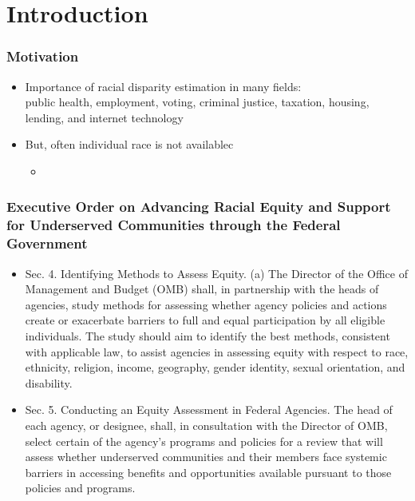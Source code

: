 \documentclass[handout]{beamer}
\title[Algorithm-Assisted Human Decision]{\tit}
\institute[Harvard]{\large Harvard University }
\date{Department of Political Science, University of Michigan\\
  March 10, 2023 \\  \vspace{.25in} Joint work with
  Cory McCartan, Jacob Goldin, and Daniel E. Ho }
\author[Kosuke Imai]{\large Kosuke Imai }
\begin{document}
\frame{\titlepage}



\section{Introduction}

\begin{frame}

  \frametitle{Motivation}

  \begin{itemize}
  \item Importance of racial disparity estimation in many fields:\\
    public health, employment, voting, criminal justice, taxation,
    housing, lending, and internet technology

    \vfill
  \item But, often individual race is not availablec
    \begin{itemize}
    \item 
    \end{itemize}

  \end{itemize}

\end{frame}


\begin{frame}

  \frametitle{Executive Order on Advancing Racial Equity and Support for Underserved Communities through the Federal Government}

  \begin{itemize}
  \item \alert{Sec. 4.  Identifying Methods to Assess Equity}.  (a)
    The Director of the Office of Management and Budget (OMB) shall,
    in partnership with the heads of agencies, study methods for
    assessing whether agency policies and actions create or exacerbate
    barriers to full and equal participation by all eligible
    individuals.  The study should aim to identify the best methods,
    consistent with applicable law, to assist agencies in assessing
    equity with respect to race, ethnicity, religion, income,
    geography, gender identity, sexual orientation, and disability.

    \vfill
  \item \alert{Sec. 5.  Conducting an Equity Assessment in Federal
      Agencies.}  The head of each agency, or designee, shall, in
    consultation with the Director of OMB, select certain of the
    agency’s programs and policies for a review that will assess
    whether underserved communities and their members face systemic
    barriers in accessing benefits and opportunities available
    pursuant to those policies and programs.
  \end{itemize}

\end{frame}
\end{document}

